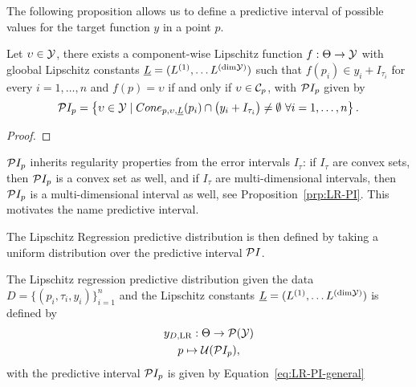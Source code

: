 The following proposition allows us to define a predictive interval of possible values for the target function $y$ in a point $p$.
\begin{prp}
    Let $\upsilon \in \mathcal Y$, there exists a component-wise Lipschitz function $f: \Theta \rightarrow \mathcal Y$ with gloobal Lipschitz constants $\underline L = (L^{(1)},\dots L^{(\text{dim}\mathcal Y)} )$ such that $f(p_i) \in y_i + I_{\tau_i}$ for every $i = 1, \dots, n$ and $f(p) = \upsilon$ if and only if $\upsilon \in \mathcal C_p$, with $\mathcal PI_p$ given by
    \begin{equation}\label{eq:LR-PI-general}
        \mathcal PI_p = \left \{ \upsilon \in \mathcal Y \mid Cone_{p,\upsilon,\underline L}(p_i) \cap  \big ( y_i + I_{\tau_i} \big ) \neq \emptyset \ \forall i = 1, \dots, n \right \}.
    \end{equation}
\end{prp}
\begin{proof}
    
\end{proof}
\begin{rmk}
    $\mathcal PI_p$ inherits regularity properties from the error intervals $I_\tau$: if $I_\tau$ are convex sets, then $\mathcal PI_p$ is a convex set as well, and if $I_\tau$ are multi-dimensional intervals, then $\mathcal PI_p$ is a multi-dimensional interval as well, see Proposition~\ref{prp:LR-PI}. 
    This motivates the name predictive interval. 
\end{rmk}

The Lipschitz Regression predictive distribution is then defined by taking a uniform distribution over the predictive interval $\mathcal P I$.
\begin{dfn} 
    The Lipschitz regression predictive distribution given the data $D=\{ (p_i, \tau_i, y_i) \}_{i=1}^n$ and the Lipschitz constants $\underline{L} = (L^{(1)},\dots L^{(\text{dim}\mathcal Y)})$ is defined by
    \begin{gather*}
        y_{D, \text{LR}} : \Theta \rightarrow \mathcal P( \mathcal Y) \\
        p \mapsto \mathcal U( \mathcal PI_p ),
    \end{gather*}
    with the predictive interval $\mathcal PI_p$ is given by Equation~\eqref{eq:LR-PI-general}
\end{dfn}

